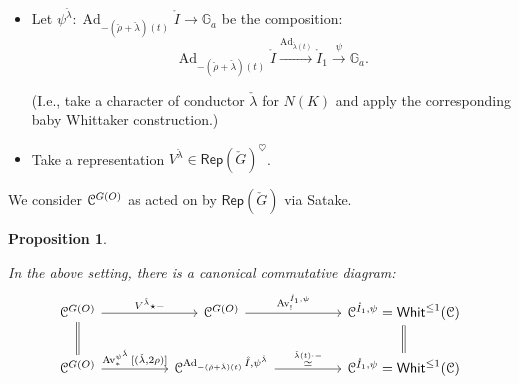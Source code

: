\documentclass[reqno,11pt]{amsart}
\numberwithin{equation}{subsection}
\newtheorem{prop}[thm]{Proposition}
\theoremstyle{remark}
\newcommand{\xar}[1]{\xrightarrow{#1}}
\newcommand{\bG}{{\mathbb G}}
\newcommand{\sC}{{\EuScript C}}
\newcommand{\on}{\operatorname}
\newcommand{\Ad}{\on{Ad}}
\newcommand{\Rep}{\mathsf{Rep}}
\newcommand{\Whit}{\mathsf{Whit}}
\newcommand{\heart}{\heartsuit}
\newcommand{\Av}{\on{Av}}
\renewcommand{\o}[1]{\mathring{#1}}
\begin{document}
\begin{itemize}

\item 

Let $\psi^{\check{\lambda}}:\Ad_{-(\check{\rho}+\check{\lambda})(t)}\o{I} \to \bG_a$ be the composition:
%
\[
\Ad_{-(\check{\rho}+\check{\lambda})(t)}\o{I} \xar{\Ad_{\check{\lambda}(t)}} \o{I}_1 \xar{\psi} \bG_a.
\]

\noindent (I.e., take a character of conductor $\check{\lambda}$ for $N(K)$ and
apply the corresponding baby Whittaker construction.)

\item 

Take a representation $V^{\check{\lambda}} \in \Rep(\check{G})^{\heart}$.

\end{itemize}

We consider $\sC^{G(O)}$ as acted on by $\Rep(\check{G})$ via Satake.

\begin{prop}\label{p:baby-cs}

In the above setting, there is a canonical commutative diagram:
%
\begin{equation}\label{eq:cs-local}
\begin{tikzcd}
\sC^{G(O)} 
\arrow[d,equals]
\arrow[rr,"V^{\check{\lambda}} \star -"]
&&
\sC^{G(O)} 
\arrow[rr,"\Av_!^{\o{I}_1,\psi}"]
&&
\sC^{\o{I}_1,\psi} = \Whit^{\leq 1}(\sC) 
\arrow[d,equals]
\\
\sC^{G(O)}
\arrow[rr,"\Av_*^{\psi^{\check{\lambda}}}{[(\check{\lambda},2\rho)]}"]
&&
\sC^{\Ad_{-(\check{\rho}+\check{\lambda})(t)}\o{I},\psi^{\check{\lambda}}}
\arrow[rr,"\overset{\check{\lambda}(t) \cdot -}{\simeq}"]
&&
\sC^{\o{I}_1,\psi} =
\Whit^{\leq 1}(\sC)
\end{tikzcd}
\end{equation}

\end{prop}
\end{document}
